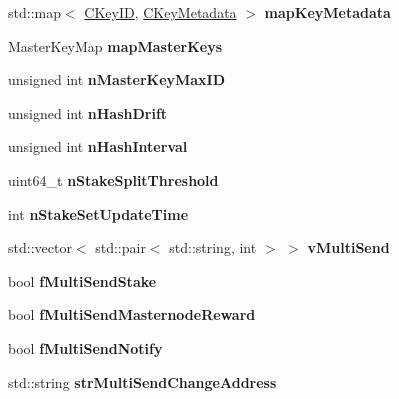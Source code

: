 \begin{DoxyCompactItemize}
std\+::map$<$ \mbox{\hyperlink{class_c_key_i_d}{C\+Key\+ID}}, \mbox{\hyperlink{class_c_key_metadata}{C\+Key\+Metadata}} $>$ {\bfseries map\+Key\+Metadata}
\item 
\mbox{\label{class_c_wallet_a23c5badf56c297a95557af3073d4aa32}} 
Master\+Key\+Map {\bfseries map\+Master\+Keys}
\item 
\mbox{\label{class_c_wallet_aecfc6e4a6ea958ec369ca77d790271e3}} 
unsigned int {\bfseries n\+Master\+Key\+Max\+ID}
\item 
\mbox{\label{class_c_wallet_a44ee1b2e9ea4e3258ca7b1366f6b215a}} 
unsigned int {\bfseries n\+Hash\+Drift}
\item 
\mbox{\label{class_c_wallet_ab35577dacef10863f2c8623398341304}} 
unsigned int {\bfseries n\+Hash\+Interval}
\item 
\mbox{\label{class_c_wallet_a72dfdee9ef3d28f15e25f12321ea28bb}} 
uint64\+\_\+t {\bfseries n\+Stake\+Split\+Threshold}
\item 
\mbox{\label{class_c_wallet_a6eacf73b158e00dbd3e80a21d466e8e2}} 
int {\bfseries n\+Stake\+Set\+Update\+Time}
\item 
\mbox{\label{class_c_wallet_a8c8eda98d29dcf6220a922ee99dcd4e0}} 
std\+::vector$<$ std\+::pair$<$ std\+::string, int $>$ $>$ {\bfseries v\+Multi\+Send}
\item 
\mbox{\label{class_c_wallet_ad2c70b312cbc3f17225f02cdfacdef18}} 
bool {\bfseries f\+Multi\+Send\+Stake}
\item 
\mbox{\label{class_c_wallet_aa0971e53fbd72f40313e3010a9c3483c}} 
bool {\bfseries f\+Multi\+Send\+Masternode\+Reward}
\item 
\mbox{\label{class_c_wallet_a503e5719c1cc2cba7cc6c8ded780c5af}} 
bool {\bfseries f\+Multi\+Send\+Notify}
\item 
\mbox{\label{class_c_wallet_aacc3b001ea316cd1116a5defb86e262e}} 
std\+::string {\bfseries str\+Multi\+Send\+Change\+Address}

\end{DoxyCompactItemize}
